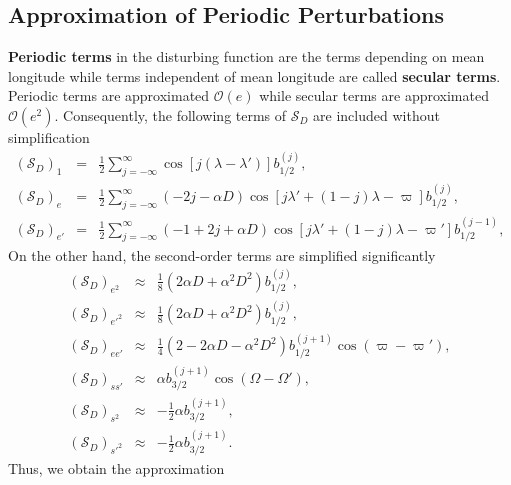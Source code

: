 \documentclass [12pt, a4paper] {article}
\begin{document}
\subsection{Approximation of Periodic Perturbations}
\textbf{Periodic terms} in the disturbing function are the terms depending on mean 
longitude while terms independent of mean longitude are called \textbf{secular terms}.
Periodic terms are approximated $\mathcal{O}(e)$ while secular terms are approximated 
$\mathcal{O}(e^2)$.
Consequently, the following terms of $\mathcal{S}_D$ are included without simplification
\begin {eqnarray}
    \left(\mathcal S_D\right)_{1}
    &=& 
    \frac{1}{2}\sum_{j=-\infty}^\infty 
    \cos[j(\lambda - \lambda')]
    b_{1/2}^{(j)},
    \\
    \left(\mathcal S_D\right)_{e}
    &=& 
    \frac{1}{2}\sum_{j=-\infty}^\infty 
    (-2j - \alpha D)
    \cos[j\lambda' + (1 - j)\lambda - \varpi]
    b_{1/2}^{(j)},
    \\
    \left(\mathcal S_D\right)_{e'}
    &=& 
    \frac{1}{2}\sum_{j=-\infty}^\infty 
    (-1 +2j + \alpha D)
    \cos[j\lambda' + (1 - j)\lambda - \varpi']
    b_{1/2}^{(j-1)},
\end {eqnarray}
On the other hand, the second-order terms are simplified significantly 
\begin {eqnarray}
    \left(\mathcal S_D\right)_{e^2}
    &\approx& 
    \frac{1}{8}(2\alpha D + \alpha^2D^2)b_{1/2}^{(j)},
    \\
    \left(\mathcal S_D\right)_{e'^2}
    &\approx& 
    \frac{1}{8}(2\alpha D + \alpha^2D^2)b_{1/2}^{(j)},
    \\
    \left(\mathcal S_D\right)_{ee'}
    &\approx& 
    \frac{1}{4}(2 - 2\alpha D - \alpha^2D^2)b_{1/2}^{(j + 1)}\cos(\varpi - \varpi'),
    \\
    \left(\mathcal S_D\right)_{ss'}
    &\approx& 
    \alpha b_{3/2}^{(j + 1)}\cos(\Omega - \Omega'),
    \\
    \left(\mathcal S_D\right)_{s^2}
    &\approx& 
    -\frac{1}{2}\alpha b_{3/2}^{(j + 1)},
    \\
    \left(\mathcal S_D\right)_{s'^2}
    &\approx& 
    -\frac{1}{2}\alpha b_{3/2}^{(j + 1)}.
\end {eqnarray}
Thus, we obtain the approximation
\end{document}
